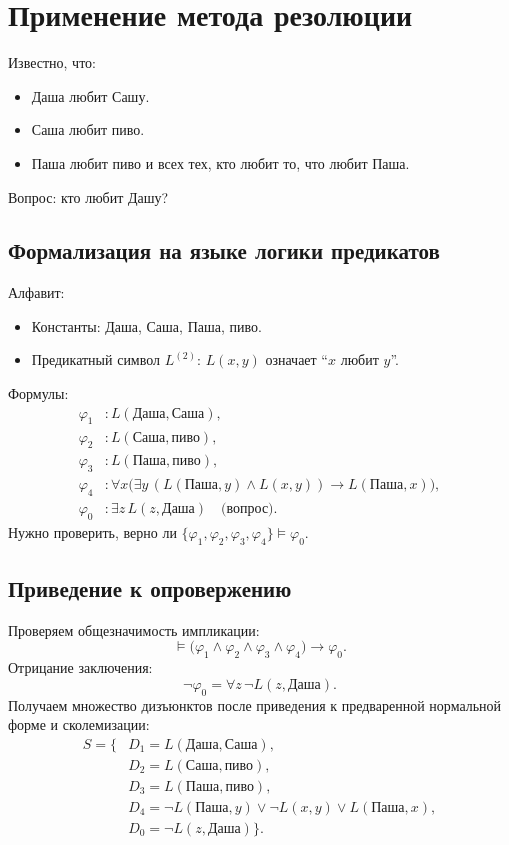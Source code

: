 \documentclass[10pt]{article}
\begin{document}
\section{Применение метода резолюции}

Известно, что:
\begin{itemize}
    \item Даша любит Сашу.
    \item Саша любит пиво.
    \item Паша любит пиво и всех тех, кто любит то, что любит Паша.
\end{itemize}
Вопрос: кто любит Дашу?

\subsection*{Формализация на языке логики предикатов}
Алфавит:
\begin{itemize}
    \item Константы: Даша, Саша, Паша, пиво.
    \item Предикатный символ $L^{(2)}$: $L(x, y)$ означает ``$x$ любит $y$''.
\end{itemize}
Формулы:
\begin{align*}
    \varphi_1 &: L(\text{Даша}, \text{Саша}), \\
    \varphi_2 &: L(\text{Саша}, \text{пиво}), \\
    \varphi_3 &: L(\text{Паша}, \text{пиво}), \\
    \varphi_4 &: \forall x \bigl( \exists y\, (L(\text{Паша}, y) \land L(x, y)) \to L(\text{Паша}, x) \bigr), \\
    \varphi_0 &: \exists z\, L(z, \text{Даша}) \quad\text{(вопрос)}.
\end{align*}
Нужно проверить, верно ли $\{\varphi_1,\varphi_2,\varphi_3,\varphi_4\} \models \varphi_0$.

\subsection*{Приведение к опровержению}
Проверяем общезначимость импликации:
\[
\models \bigl(\varphi_1 \land \varphi_2 \land \varphi_3 \land \varphi_4\bigr) \to \varphi_0.
\]
Отрицание заключения:
\[
\neg\varphi_0 = \forall z\, \neg L(z, \text{Даша}).
\]
Получаем множество дизъюнктов после приведения к предваренной нормальной форме и сколемизации:
\begin{align*}
    S = \{
    & D_1 = L(\text{Даша}, \text{Саша}), \\
    & D_2 = L(\text{Саша}, \text{пиво}), \\
    & D_3 = L(\text{Паша}, \text{пиво}), \\
    & D_4 = \neg L(\text{Паша}, y) \lor \neg L(x, y) \lor L(\text{Паша}, x), \\
    & D_0 = \neg L(z, \text{Даша}) \}.
\end{align*}
\end{document}

